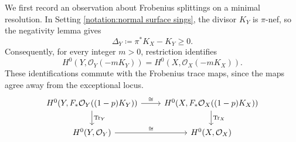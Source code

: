 \documentclass[12pt]{amsart}
\newcommand{\sO}{\mathcal{O}}
\theoremstyle{plain}
\theoremstyle{definition}
\theoremstyle{remark}
\newtheorem{defn and notation}[thm]{Definition and Notation}
\theoremstyle{plain}
\numberwithin{equation}{thm}
\begin{document}
We first record an observation about Frobenius splittings on a minimal resolution.
In Setting \ref{notation:normal surface sings}, the divisor $K_Y$ is $\pi$-nef, so the negativity lemma gives
\[
\Delta_Y\coloneqq\pi^*K_X-K_Y\geq 0.
\]
Consequently, for every integer $m>0$, restriction identifies
\begin{equation}\label{eq:anticanonical-sections-minimal-resolution}
H^0(Y,\sO_Y(-mK_Y))=H^0(X,\sO_X(-mK_X)).
\end{equation}
These identifications commute with the Frobenius trace maps, since the maps agree away from the exceptional locus.
    \begin{equation}\label{eq:compatible trace}
        \begin{tikzcd}
        H^0(Y, F_*\sO_Y((1-p)K_Y)) \arrow[r,"\cong"] \arrow[d,"\mathrm{Tr}_Y"] & H^0(X , F_*\sO_X((1-p)K_X)) \arrow[d,"\mathrm{Tr}_X"] \\
        H^0(Y,\sO_Y) \arrow[r,"\cong"] & H^0(X,\sO_X)
    \end{tikzcd}
    \end{equation}
\end{document}
